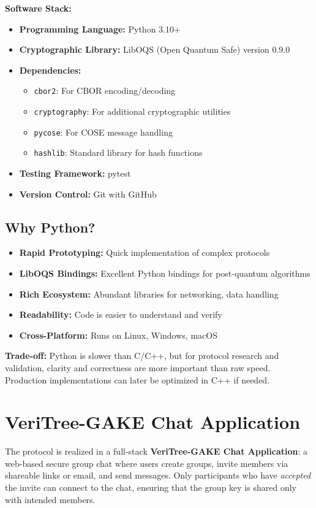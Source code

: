 \documentclass[12pt,a4paper]{report}
\begin{document}
\textbf{Software Stack:}
\begin{itemize}
\item \textbf{Programming Language:} Python 3.10+
\item \textbf{Cryptographic Library:} LibOQS (Open Quantum Safe) version 0.9.0
\item \textbf{Dependencies:}
\begin{itemize}
\item \texttt{cbor2}: For CBOR encoding/decoding
\item \texttt{cryptography}: For additional cryptographic utilities
\item \texttt{pycose}: For COSE message handling
\item \texttt{hashlib}: Standard library for hash functions
\end{itemize}
\item \textbf{Testing Framework:} pytest
\item \textbf{Version Control:} Git with GitHub
\end{itemize}

\subsection{Why Python?}

\begin{itemize}
\item \textbf{Rapid Prototyping:} Quick implementation of complex protocols
\item \textbf{LibOQS Bindings:} Excellent Python bindings for post-quantum algorithms
\item \textbf{Rich Ecosystem:} Abundant libraries for networking, data handling
\item \textbf{Readability:} Code is easier to understand and verify
\item \textbf{Cross-Platform:} Runs on Linux, Windows, macOS
\end{itemize}

\textbf{Trade-off:} Python is slower than C/C++, but for protocol research and validation, clarity and correctness are more important than raw speed. Production implementations can later be optimized in C++ if needed.

\section{VeriTree-GAKE Chat Application}

The protocol is realized in a full-stack \textbf{VeriTree-GAKE Chat Application}: a web-based secure group chat where users create groups, invite members via shareable links or email, and send messages. Only participants who have \emph{accepted} the invite can connect to the chat, ensuring that the group key is shared only with intended members.
\end{document}
